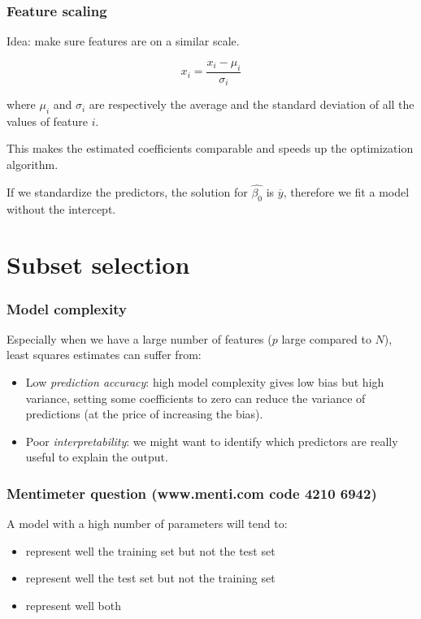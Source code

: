 \documentclass[notes]{beamer}          %
\begin{document}
\begin{frame}
\frametitle{Feature scaling}

Idea: make sure features are on a similar scale.

\begin{equation*}
x_i = \frac{x_i-\mu_i}{\sigma_i}
\end{equation*}

where $\mu_i$ and $\sigma_i$ are respectively the average and the standard deviation of all the values of feature $i$.

\vspace{5mm}

This makes the estimated coefficients comparable and speeds up the optimization algorithm.

\vspace{5mm} 

If we standardize the predictors, the solution for $\hat{\beta_0}$ is $\overline{y}$, therefore we fit a model without the intercept.

\end{frame}


\section{Subset selection}

\begin{frame}
\frametitle{Model complexity}

Especially when we have a large number of features ($p$ large compared to $N$), least squares estimates can suffer from:

\begin{itemize}
    \item Low \textit{prediction accuracy}: high model complexity gives low bias but high variance, setting some coefficients to zero can reduce the variance of predictions (at the price of increasing the bias).
    \item Poor \textit{interpretability}: we might want to identify which predictors are really useful to explain the output.
\end{itemize}

\end{frame}


\begin{frame}
\frametitle{Mentimeter question (www.menti.com code 4210 6942)}

A model with a high number of parameters will tend to:
\begin{itemize}
    \item represent well the training set but not the test set
    \item represent well the test set but not the training set
    \item represent well both
\end{itemize}
\end{frame}
\end{document}
